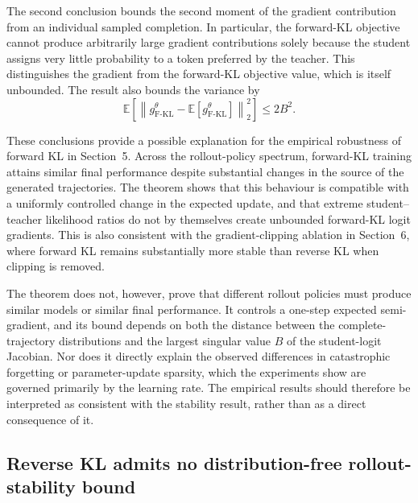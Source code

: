 \documentclass{article} %
\theoremstyle{plain}
\theoremstyle{definition}
\theoremstyle{remark}
\begin{document}
The second conclusion bounds the second moment of the gradient contribution
from an individual sampled completion.  In particular, the forward-KL
objective cannot produce arbitrarily large gradient contributions solely
because the student assigns very little probability to a token preferred by
the teacher.  This distinguishes the gradient from the forward-KL objective
value, which is itself unbounded.  The result also bounds the variance by
\begin{equation}
    \mathbb E\left[
        \left\lVert
            g_{\mathrm{F\text{-}KL}}^\theta
            -\mathbb E[g_{\mathrm{F\text{-}KL}}^\theta]
        \right\rVert_2^2
    \right]
    \le 2B^2.
\end{equation}

These conclusions provide a possible explanation for the empirical robustness
of forward KL in Section~5.  Across the rollout-policy spectrum, forward-KL
training attains similar final performance despite substantial changes in the
source of the generated trajectories.  The theorem shows that this behaviour
is compatible with a uniformly controlled change in the expected update, and
that extreme student--teacher likelihood ratios do not by themselves create
unbounded forward-KL logit gradients.  This is also consistent with the
gradient-clipping ablation in Section~6, where forward KL remains substantially
more stable than reverse KL when clipping is removed.

The theorem does not, however, prove that different rollout policies must
produce similar models or similar final performance.  It controls a one-step
expected semi-gradient, and its bound depends on both the distance between the
complete-trajectory distributions and the largest singular value $B$ of the
student-logit Jacobian.  Nor does it directly explain the observed differences
in catastrophic forgetting or parameter-update sparsity, which the experiments
show are governed primarily by the learning rate.  The empirical results
should therefore be interpreted as consistent with the stability result,
rather than as a direct consequence of it.

\subsection{Reverse KL admits no distribution-free rollout-stability bound}
\label{app:reverse-rollout-sensitivity}
\end{document}
